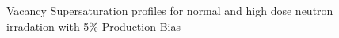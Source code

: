 \documentclass[a4paper]{article}
\begin{document}
      \begin{figure}[h!]  %
        \centering
        \qquad
        \caption{Vacancy Supersaturation profiles for normal and high dose neutron irradation with 5\% Production Bias}
        \label{figure:vacancy_supersaturation_neutron_5}
      \end{figure}
\end{document}
